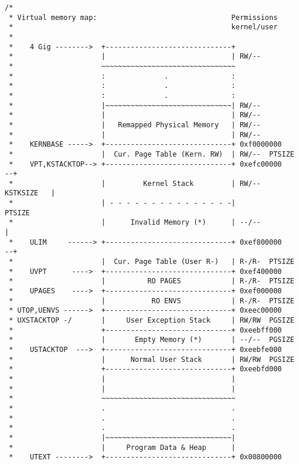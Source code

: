 \documentclass{article}
\begin{document}
\begin{CJK*}{UTF8}{gkai}
\begin{lstlisting}[style=ccode, title={\scriptsize \ttfamily \bfseries inc/memlayout.h}]
/*
 * Virtual memory map:                                Permissions
 *                                                    kernel/user
 *
 *    4 Gig -------->  +------------------------------+
 *                     |                              | RW/--
 *                     ~~~~~~~~~~~~~~~~~~~~~~~~~~~~~~~~
 *                     :              .               :
 *                     :              .               :
 *                     :              .               :
 *                     |~~~~~~~~~~~~~~~~~~~~~~~~~~~~~~| RW/--
 *                     |                              | RW/--
 *                     |   Remapped Physical Memory   | RW/--
 *                     |                              | RW/--
 *    KERNBASE ----->  +------------------------------+ 0xf0000000
 *                     |  Cur. Page Table (Kern. RW)  | RW/--  PTSIZE
 *    VPT,KSTACKTOP--> +------------------------------+ 0xefc00000      --+
 *                     |         Kernel Stack         | RW/--  KSTKSIZE   |
 *                     | - - - - - - - - - - - - - - -|                 PTSIZE
 *                     |      Invalid Memory (*)      | --/--             |
 *    ULIM     ------> +------------------------------+ 0xef800000      --+
 *                     |  Cur. Page Table (User R-)   | R-/R-  PTSIZE
 *    UVPT      ---->  +------------------------------+ 0xef400000
 *                     |          RO PAGES            | R-/R-  PTSIZE
 *    UPAGES    ---->  +------------------------------+ 0xef000000
 *                     |           RO ENVS            | R-/R-  PTSIZE
 * UTOP,UENVS ------>  +------------------------------+ 0xeec00000
 * UXSTACKTOP -/       |     User Exception Stack     | RW/RW  PGSIZE
 *                     +------------------------------+ 0xeebff000
 *                     |       Empty Memory (*)       | --/--  PGSIZE
 *    USTACKTOP  --->  +------------------------------+ 0xeebfe000
 *                     |      Normal User Stack       | RW/RW  PGSIZE
 *                     +------------------------------+ 0xeebfd000
 *                     |                              |
 *                     |                              |
 *                     ~~~~~~~~~~~~~~~~~~~~~~~~~~~~~~~~
 *                     .                              .
 *                     .                              .
 *                     .                              .
 *                     |~~~~~~~~~~~~~~~~~~~~~~~~~~~~~~|
 *                     |     Program Data & Heap      |
 *    UTEXT -------->  +------------------------------+ 0x00800000
\end{lstlisting}


\end{CJK*}
\end{document}
